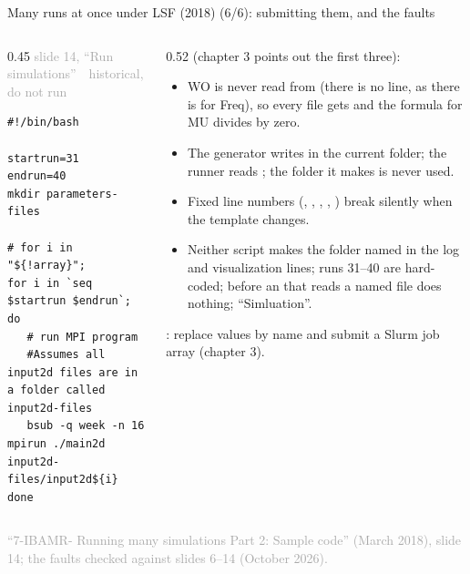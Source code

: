 \documentclass[aspectratio=169,11pt]{beamer}
\newcommand{\sourcecredit}[1]{\vfill\begin{flushright}\tiny\textcolor{DarkGray}{#1}\end{flushright}}
\newcommand{\hist}[1]{{\tiny\sffamily\textcolor{DarkGray}{#1\ \textbullet\ historical, do not run}}\par\nointerlineskip\vspace{0.3mm}}
\begin{document}
\begin{frame}[fragile]{Many runs at once under LSF (2018) (6/6): submitting them, and the faults}
\label{fr:sweep4}
\begin{columns}[T,onlytextwidth]
\begin{column}{0.45\textwidth}
\hist{slide 14, ``Run simulations''}
\begin{lstlisting}[style=hist]
#!/bin/bash

startrun=31
endrun=40
mkdir parameters-files

# for i in "${!array}";
for i in `seq $startrun $endrun`;
do
   # run MPI program
   #Assumes all input2d files are in a folder called input2d-files
   bsub -q week -n 16 mpirun ./main2d input2d-files/input2d${i}
done
\end{lstlisting}
\end{column}
\begin{column}{0.52\textwidth}
\scriptsize {} (chapter 3 points out the first three):
\begin{itemize}\setlength{\itemsep}{1.5pt}
  \item WO is never read from  (there is no  line, as there is for Freq), so every file gets  and the formula for MU divides by zero.
  \item The generator writes  in the current folder; the runner reads ; the  folder it makes is never used.
  \item Fixed line numbers (, , , , ) break silently when the template changes.
  \item Neither script makes the  folder named in the log and visualization lines; runs 31--40 are hard-coded;  before an  that reads a named file does nothing; ``Simluation''.
\end{itemize}
\vspace{1mm}
\footnotesize {}: replace values by name and submit a Slurm job array (chapter 3).
\end{column}
\end{columns}
\sourcecredit{``7-IBAMR- Running many simulations Part 2: Sample code'' (March 2018), slide 14; the faults checked against slides 6--14 (October 2026).}
\end{frame}
\end{document}
